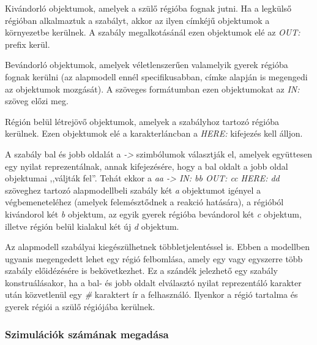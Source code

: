 \begin{compactenum}
	\item Kivándorló objektumok, amelyek a szülő régióba fognak jutni. Ha a legkülső régióban alkalmaztuk a szabályt, akkor az ilyen címkéjű objektumok a környezetbe kerülnek. A szabály megalkotásánál ezen objektumok elé az \textit{OUT:} prefix kerül.
	\item Bevándorló objektumok, amelyek véletlenszerűen valamelyik gyerek régióba fognak kerülni (az alapmodell ennél specifikusabban, címke alapján is megengedi az objektumok mozgását). A szöveges formátumban ezen objektumokat az \textit{IN:} szöveg előzi meg.
	\item Régión belül létrejövő objektumok, amelyek a szabályhoz tartozó régióba kerülnek. Ezen objektumok elé a karakterláncban a \textit{HERE:} kifejezés kell álljon.
\end{compactenum}
A szabály bal és jobb oldalát a \textit{->} szimbólumok választják el, amelyek együttesen egy nyilat reprezentálnak, annak kifejezésére, hogy a bal oldalt a jobb oldal objektumai ,,váljták fel''.
Tehát ekkor a \textit{ aa -> IN: bb OUT: cc HERE: dd} szöveghez tartozó alapmodellbeli szabály két \textit{a} objektumot igényel a végbemeneteléhez (amelyek felemésztődnek a reakció hatására), a régióból kivándorol két \textit{b} objektum, az egyik gyerek régióba bevándorol két \textit{c} objektum, illetve régión belül kialakul két új \textit{d} objektum.

Az alapmodell szabályai kiegészülhetnek többletjelentéssel is. Ebben a modellben ugyanis megengedett lehet egy régió felbomlása, amely egy vagy egyszerre több szabály előidézésére is bekövetkezhet. Ez a szándék jelezhető egy szabály konstruálásakor, ha a bal- és jobb oldalt elválasztó nyilat reprezentáló karakter után közvetlenül egy \textit{\#} karaktert ír a felhasználó. Ilyenkor a régió tartalma és gyerek régiói a szülő régiójába kerülnek.



\subsubsection{Szimulációk számának megadása}

